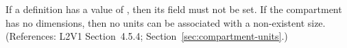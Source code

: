 If a \Compartment definition has a  value
of , then its  field must not be set. If the
compartment has no dimensions, then no units can be associated
with a non-existent size.  (References: L2V1 Section~4.5.4;
Section~\ref{sec:compartment-units}.)
